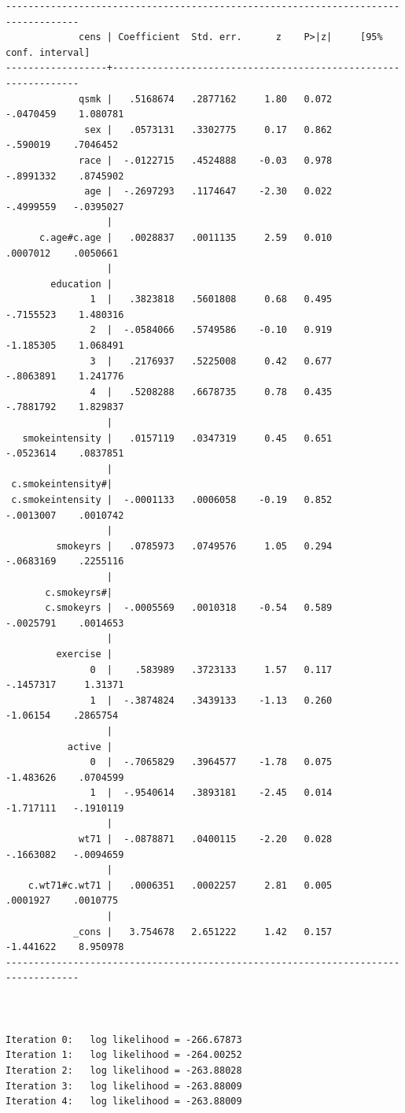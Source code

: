 \documentclass[
  10pt,
  a4paper,
]{book}
\begin{document}
\begin{verbatim}
-----------------------------------------------------------------------------------
             cens | Coefficient  Std. err.      z    P>|z|     [95% conf. interval]
------------------+----------------------------------------------------------------
             qsmk |   .5168674   .2877162     1.80   0.072    -.0470459    1.080781
              sex |   .0573131   .3302775     0.17   0.862     -.590019    .7046452
             race |  -.0122715   .4524888    -0.03   0.978    -.8991332    .8745902
              age |  -.2697293   .1174647    -2.30   0.022    -.4999559   -.0395027
                  |
      c.age#c.age |   .0028837   .0011135     2.59   0.010     .0007012    .0050661
                  |
        education |
               1  |   .3823818   .5601808     0.68   0.495    -.7155523    1.480316
               2  |  -.0584066   .5749586    -0.10   0.919    -1.185305    1.068491
               3  |   .2176937   .5225008     0.42   0.677    -.8063891    1.241776
               4  |   .5208288   .6678735     0.78   0.435    -.7881792    1.829837
                  |
   smokeintensity |   .0157119   .0347319     0.45   0.651    -.0523614    .0837851
                  |
 c.smokeintensity#|
 c.smokeintensity |  -.0001133   .0006058    -0.19   0.852    -.0013007    .0010742
                  |
         smokeyrs |   .0785973   .0749576     1.05   0.294    -.0683169    .2255116
                  |
       c.smokeyrs#|
       c.smokeyrs |  -.0005569   .0010318    -0.54   0.589    -.0025791    .0014653
                  |
         exercise |
               0  |    .583989   .3723133     1.57   0.117    -.1457317     1.31371
               1  |  -.3874824   .3439133    -1.13   0.260     -1.06154    .2865754
                  |
           active |
               0  |  -.7065829   .3964577    -1.78   0.075    -1.483626    .0704599
               1  |  -.9540614   .3893181    -2.45   0.014    -1.717111   -.1910119
                  |
             wt71 |  -.0878871   .0400115    -2.20   0.028    -.1663082   -.0094659
                  |
    c.wt71#c.wt71 |   .0006351   .0002257     2.81   0.005     .0001927    .0010775
                  |
            _cons |   3.754678   2.651222     1.42   0.157    -1.441622    8.950978
-----------------------------------------------------------------------------------



Iteration 0:   log likelihood = -266.67873  
Iteration 1:   log likelihood = -264.00252  
Iteration 2:   log likelihood = -263.88028  
Iteration 3:   log likelihood = -263.88009  
Iteration 4:   log likelihood = -263.88009  


\end{verbatim}
\end{document}
